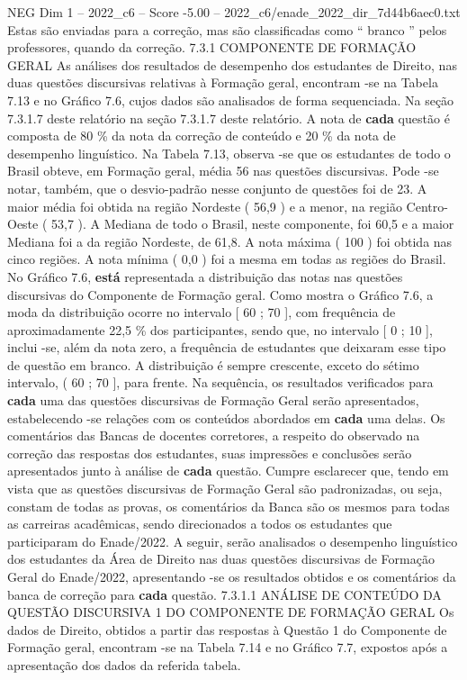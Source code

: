\begin{textsample}{NEG Dim 1 – 2022\_c6 – Score -5.00 – 2022\_c6/enade\_2022\_dir\_7d44b6aec0.txt}
Estas são enviadas para a correção, mas são classificadas como “ branco ” pelos professores, quando da correção. 7.3.1 COMPONENTE DE FORMAÇÃO GERAL As análises dos resultados de desempenho dos estudantes de Direito, nas duas questões discursivas relativas à Formação geral, encontram -se na Tabela 7.13 e no Gráfico 7.6, cujos dados são analisados de forma sequenciada.
Na seção 7.3.1.7 deste relatório na seção 7.3.1.7 deste relatório.
A nota de \textbf{cada} questão é composta de 80 \% da nota da correção de conteúdo e 20 \% da nota de desempenho linguístico.
Na Tabela 7.13, observa -se que os estudantes de todo o Brasil obteve, em Formação geral, média 56 nas questões discursivas.
Pode -se notar, também, que o desvio-padrão nesse conjunto de questões foi de 23.
A maior média foi obtida na região Nordeste ( 56,9 ) e a menor, na região Centro-Oeste ( 53,7 ).
A Mediana de todo o Brasil, neste componente, foi 60,5 e a maior Mediana foi a da região Nordeste, de 61,8.
A nota máxima ( 100 ) foi obtida nas cinco regiões.
A nota mínima ( 0,0 ) foi a mesma em todas as regiões do Brasil.
No Gráfico 7.6, \textbf{está} representada a distribuição das notas nas questões discursivas do Componente de Formação geral.
Como mostra o Gráfico 7.6, a moda da distribuição ocorre no intervalo [ 60 ; 70 ], com frequência de aproximadamente 22,5 \% dos participantes, sendo que, no intervalo [ 0 ; 10 ], inclui -se, além da nota zero, a frequência de estudantes que deixaram esse tipo de questão em branco.
A distribuição é sempre crescente, exceto do sétimo intervalo, ( 60 ; 70 ], para frente.
Na sequência, os resultados verificados para \textbf{cada} uma das questões discursivas de Formação Geral serão apresentados, estabelecendo -se relações com os conteúdos abordados em \textbf{cada} uma delas.
Os comentários das Bancas de docentes corretores, a respeito do observado na correção das respostas dos estudantes, suas impressões e conclusões serão apresentados junto à análise de \textbf{cada} questão.
Cumpre esclarecer que, tendo em vista que as questões discursivas de Formação Geral são padronizadas, ou seja, constam de todas as provas, os comentários da Banca são os mesmos para todas as carreiras acadêmicas, sendo direcionados a todos os estudantes que participaram do Enade/2022.
A seguir, serão analisados o desempenho linguístico dos estudantes da Área de Direito nas duas questões discursivas de Formação Geral do Enade/2022, apresentando -se os resultados obtidos e os comentários da banca de correção para \textbf{cada} questão. 7.3.1.1 ANÁLISE DE CONTEÚDO DA QUESTÃO DISCURSIVA 1 DO COMPONENTE DE FORMAÇÃO GERAL Os dados de Direito, obtidos a partir das respostas à Questão 1 do Componente de Formação geral, encontram -se na Tabela 7.14 e no Gráfico 7.7, expostos após a apresentação dos dados da referida tabela.

\end{textsample}
